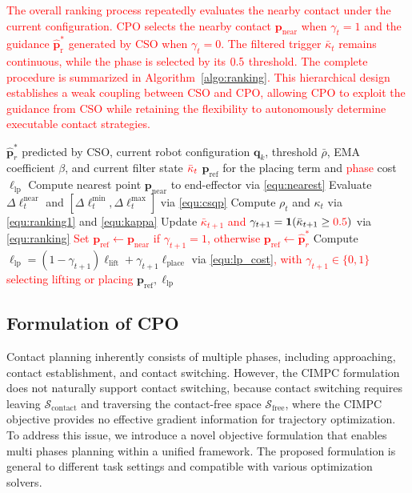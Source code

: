 \textcolor{red}{
The overall ranking process repeatedly evaluates the nearby contact
under the current configuration.} \textcolor{red}{CPO selects the nearby contact $\boldsymbol{p}_{\mathrm{near}}$ when $\gamma_t=1$ and the guidance $\hat{\boldsymbol{p}}_{\mathrm r}^{*}$ generated by CSO when $\gamma_t=0$. The filtered trigger $\bar{\kappa}_t$ remains continuous, while the phase is selected by its $\textcolor{red}{0.5}$ threshold.}
\textcolor{red}{
The complete procedure is summarized in Algorithm~\ref{algo:ranking}. This hierarchical design establishes a weak coupling between CSO and CPO, allowing CPO to exploit the guidance from CSO while retaining the flexibility to autonomously determine executable contact strategies.
}

\begin{algorithm}[t]
\caption{Ranking Strategy of CPO}
\label{algo:ranking}
\begin{algorithmic}[1]
\Require $\boldsymbol{\hat{p}}^*_r$ predicted by CSO, current robot configuration $\boldsymbol{q}_k$, threshold $\bar{\rho}$, EMA coefficient $\beta$, and current filter state $\textcolor{red}{\bar{\kappa}_t}$
\Ensure $\boldsymbol{p}_{\text{ref}}$ for the placing term and \textcolor{red}{phase} cost $\ell_{\text{lp}}$
\State Compute nearest point $\boldsymbol{p}_{\text{near}}$ to end-effector via \eqref{equ:nearest}
\State Evaluate $\Delta\ell_t^{\mathrm{near}}$ and $[\Delta\ell_t^{\mathrm{min}},\Delta\ell_t^{\mathrm{max}}]$ via \eqref{equ:csqp}
\State Compute $\rho_t$ and $\kappa_t$ via \eqref{equ:ranking1} and \eqref{equ:kappa}
\State Update \textcolor{red}{$\bar{\kappa}_{t+1}$ and $\gamma_{t+1}=\mathbf{1}(\bar{\kappa}_{t+1}\geq \textcolor{red}{0.5})$} via \eqref{equ:ranking}
\State \textcolor{red}{Set $\boldsymbol{p}_{\text{ref}}\gets\boldsymbol{p}_{\text{near}}$ if $\gamma_{t+1}=1$, otherwise $\boldsymbol{p}_{\text{ref}}\gets\boldsymbol{\hat{p}}^*_r$}
\State Compute $\ell_{\text{lp}}=(1-\gamma_{t+1})\ell_{\text{lift}}+\gamma_{t+1}\ell_{\text{place}}$ via \eqref{equ:lp_cost}\textcolor{red}{, with $\gamma_{t+1}\in\{0,1\}$ selecting lifting or placing}
\State \Return $\boldsymbol{p}_{\text{ref}},\ell_{\text{lp}}$
\end{algorithmic}
\end{algorithm}

\subsection{Formulation of CPO}

Contact planning inherently consists of multiple phases, including approaching, contact establishment, and contact switching. However, the CIMPC formulation does not naturally support contact switching, because contact switching requires leaving $\mathcal{S}_{\text{contact}}$ and traversing the contact-free space $\mathcal{S}_{\text{free}}$, where the CIMPC objective provides no effective gradient information for trajectory optimization. To address this issue, we introduce a novel objective formulation that enables multi phases planning within a unified framework. The proposed formulation is general to different task settings and compatible with various optimization solvers.

